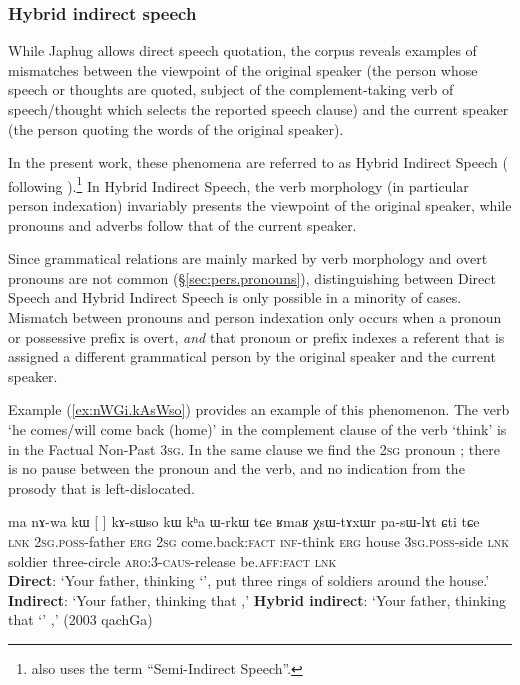\subsubsection{Hybrid indirect speech} \label{sec:hybrid indirect}
While Japhug allows direct speech quotation, the corpus reveals examples of mismatches between the viewpoint of the original speaker (the person whose speech or thoughts are quoted, subject of the com\-ple\-ment-taking verb of speech/thought which selects the reported speech clause) and the current speaker (the person quoting the words of the original speaker).

In the present work, these phenomena are referred to as Hybrid Indirect Speech (\citealt{jacques16complementation} following \citet{tournadre08conjunct}).\footnote{\citet{aikhenvald08semidirect} also uses the term ``Semi-Indirect Speech''. } In Hybrid Indirect Speech, the verb morphology (in particular person indexation) invariably presents the viewpoint of the original speaker, while pronouns and adverbs follow that of the current speaker.

Since grammatical relations are mainly marked by verb morphology and overt pronouns are not common (§\ref{sec:pers.pronouns}), distinguishing between Direct Speech and Hybrid Indirect Speech is only possible in a minority of cases. Mismatch between pronouns and person indexation only occurs when a pronoun or possessive prefix is overt, \textit{and} that pronoun or prefix indexes a referent that is assigned a different grammatical person by the  original speaker and the current speaker.
 
   
Example (\ref{ex:nWGi.kAsWso}) provides an example of this phenomenon. The verb  `he comes/will come back (home)' in the complement clause of the verb  `think' is in the Factual Non-Past \textsc{3sg}. In the same clause we find the \textsc{2sg} pronoun ; there is no pause between the pronoun and the verb, and no indication from the prosody that  is left-dislocated. 


\begin{exe}
\ex \label{ex:nWGi.kAsWso}
\gll ma nɤ-wa kɯ [ 	]  kɤ-sɯso kɯ kʰa ɯ-rkɯ tɕe ʁmaʁ χsɯ-tɤxɯr pa-sɯ-lɤt ɕti tɕe \\
\textsc{lnk} \textsc{2sg}.\textsc{poss}-father \textsc{erg} \textsc{2sg} {come.back:\textsc{fact}}  \textsc{inf}-think \textsc{erg} house \textsc{3sg}.\textsc{poss}-side \textsc{lnk} soldier three-circle \textsc{aro}:3\flobv{}-\textsc{caus}-release be.\textsc{aff}:\textsc{fact} \textsc{lnk}\\
\glt \textbf{Direct}: `Your father, thinking `', put three rings of soldiers around the house.' 
\glt  \textbf{Indirect}: `Your father, thinking that ,'
\glt  \textbf{Hybrid indirect}: `Your father, thinking that `' ,' (2003 qachGa)
\end{exe}

